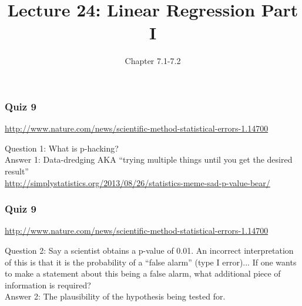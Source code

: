 \documentclass[handout]{beamer}
\title{Lecture 24: Linear Regression Part I}
\author{Chapter 7.1-7.2}
\date{}
\newcommand{\blue}[1]{\textcolor{blue2}{#1}}
\begin{document}
\begin{frame}
\titlepage
\end{frame}


\begin{frame}[fragile]
\frametitle{Quiz 9}

\blue{\url{http://www.nature.com/news/scientific-method-statistical-errors-1.14700}}

\vspace{0.5cm}

\blue{Question 1}: What is p-hacking?\\

\pause \blue{Answer 1}: Data-dredging AKA ``trying multiple things until you get the desired result''\\ 

\blue{\url{http://simplystatistics.org/2013/08/26/statistics-meme-sad-p-value-bear/}}

\end{frame}


\begin{frame}[fragile]
\frametitle{Quiz 9}

\blue{\url{http://www.nature.com/news/scientific-method-statistical-errors-1.14700}}

\vspace{0.5cm}

\blue{Question 2}: Say a scientist obtains a p-value of 0.01.  An incorrect interpretation of this is that it is the probability of a ``false alarm'' (type I error)...  If one wants to make a statement about this being a false alarm, what additional piece of information is required?\\

\pause \blue{Answer 2}: The plausibility of the hypothesis being tested for.  

\end{frame}
\end{document}
